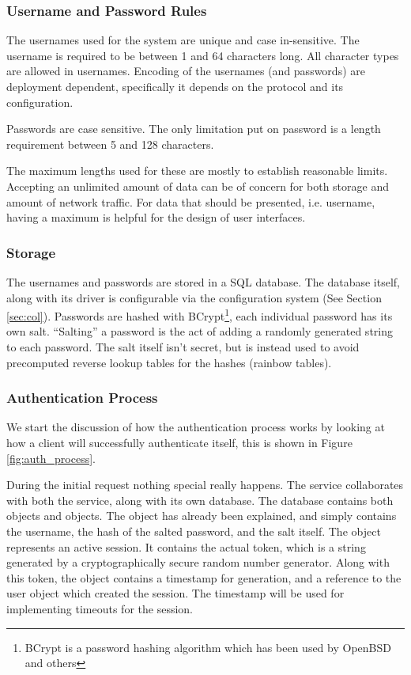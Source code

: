 \subsubsection*{Username and Password Rules}

The usernames used for the system are unique and case in-sensitive. The
username is required to be between 1 and 64 characters long. All character
types are allowed in usernames. Encoding of the usernames (and passwords) are
deployment dependent, specifically it depends on the protocol and its
configuration.

Passwords are case sensitive. The only limitation put on password is a length
requirement between 5 and 128 characters.

The maximum lengths used for these are mostly to establish reasonable limits.
Accepting an unlimited amount of data can be of concern for both storage and
amount of network traffic. For data that should be presented, i.e. username,
having a maximum is helpful for the design of user interfaces.

\subsubsection*{Storage}

The usernames and passwords are stored in a SQL database. The database itself,
along with its driver is configurable via the configuration system (See
Section \ref{sec:col}). Passwords are hashed with
BCrypt\footnote{BCrypt is a password hashing algorithm which has been used
by OpenBSD and others}\cite{provos1999future}, each individual password has
its own salt. ``Salting'' a password is the act of adding a randomly
generated string to each password. The salt itself isn't secret,
but is instead used to avoid precomputed reverse lookup tables for
the hashes (rainbow tables).

\subsubsection*{Authentication Process}

We start the discussion of how the authentication process works by looking at
how a client will successfully authenticate itself, this is shown in Figure
\ref{fig:auth_process}.

During the initial request nothing special really happens. The \security
service collaborates with both the \bcrypt service, along with its own
database. The database contains both  objects and 
objects. The  object has already been explained, and simply contains
the username, the hash of the salted password, and the salt itself. The
 object represents an active session. It contains the actual
token, which is a string generated by a cryptographically secure random number
generator. Along with this token, the object contains a timestamp for
generation, and a reference to the user object which created the session. The
timestamp will be used for implementing timeouts for the session.

